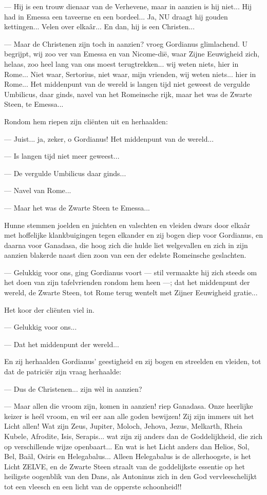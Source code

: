 \documentclass[a4paper, 12pt, oneside, dutch]{article}
\begin{document}
--- Hij is een trouw dienaar van de Verhevene, maar in aanzien is hij niet... Hij had in Emessa een taveerne en een bordeel... Ja, NU draagt hij gouden kettingen... Velen over elkaâr... En dan, hij is een Christen...

--- Maar de Christenen zijn toch in aanzien? vroeg Gordianus glimlachend. U begrijpt, wij zoo ver van Emessa en van Nicome-dië, waar Zijne Eeuwigheid zich, helaas, zoo heel lang van ons moest terugtrekken... wij weten niets, hier in Rome... Niet waar, Sertorius, niet waar, mijn vrienden, wij weten niets... hier in Rome... Het middenpunt van de wereld is langen tijd niet geweest de vergulde Umbilicus, daar ginds, navel van het Romeinsche rijk, maar het was de Zwarte Steen, te Emessa...

Rondom hem riepen zijn cliënten uit en herhaalden:

--- Juist... ja, zeker, o Gordianus! Het middenpunt van de wereld...

--- Is langen tijd niet meer geweest...

--- De vergulde Umbilicus daar ginds...

--- Navel van Rome...

--- Maar het was de Zwarte Steen te Emessa...

Hunne stemmen joelden en juichten en valschten en vleiden dwars door elkaâr met hoffelijke klankbuigingen tegen elkander en zij bogen diep voor Gordianus, en daarna voor Ganadasa, die hoog zich die hulde liet welgevallen en zich in zijn aanzien blakerde naast dien zoon van een der edelste Romeinsche geslachten.

--- Gelukkig voor ons, ging Gordianus voort --- stil vermaakte hij zich steeds om het doen van zijn tafelvrienden rondom hem heen ---; dat het middenpunt der wereld, de Zwarte Steen, tot Rome terug wentelt met Zijner Eeuwigheid gratie...

Het koor der cliënten viel in.

--- Gelukkig voor ons...

--- Dat het middenpunt der wereld...

En zij herhaalden Gordianus' geestigheid en zij bogen en streelden en vleiden, tot dat de patriciër zijn vraag herhaalde:

--- Dus de Christenen... zijn wèl in aanzien?

--- Maar allen die vroom zijn, komen in aanzien! riep Ganadasa. Onze heerlijke keizer is heél vroom, en wil eer aan alle goden bewijzen! Zij zijn immers uit het Licht allen! Wat zijn Zeus, Jupiter, Moloch, Jehova, Jezus, Melkarth, Rheia Kubele, Afrodite, Isis, Serapis... wat zijn zij anders dan de Goddelijkheid, die zich op verschillende wijze openbaart... En wat is het Licht anders dan Helios, Sol, Bel, Baäl, Osiris en Helegabalus... Alleen Helegabalus is de allerhoogste, is het Licht ZELVE, en de Zwarte Steen straalt van de goddelijkste essentie op het heiligste oogenblik van den Dans, als Antoninus zich in den God vervleeschelijkt tot een vleesch en een licht van de opperste schoonheid!!
\end{document}
